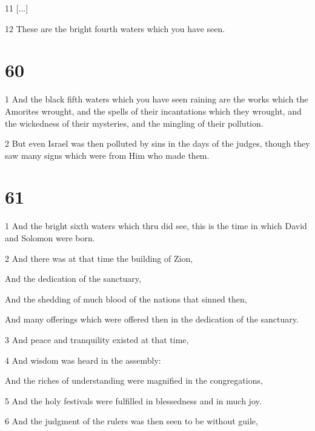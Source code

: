 \par 11 [...]

\par 12 These are the bright fourth waters which you have seen.

\chapter{60}

\par 1 And the black fifth waters which you have seen raining are the works which the Amorites wrought, and the spells of their incantations which they wrought, and the wickedness of their mysteries, and the mingling of their pollution. 

\par 2 But even Israel was then polluted by sins in the days of the judges, though they saw many signs which were from Him who made them.

\chapter{61}

\par 1 And the bright sixth waters which thru did see, this is the time in which David and Solomon were born.

\par 2 And there was at that time the building of Zion,

\par And the dedication of the sanctuary,

\par And the shedding of much blood of the nations that sinned then,

\par And many offerings which were offered then in the dedication of the sanctuary.

\par 3 And peace and tranquility existed at that time,

\par 4 And wisdom was heard in the assembly:

\par And the riches of understanding were magnified in the congregations,

\par 5 And the holy festivals were fulfilled in blessedness and in much joy.

\par 6 And the judgment of the rulers was then seen to be without guile,

